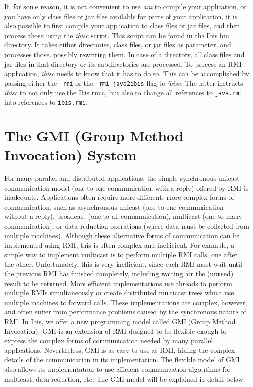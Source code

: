 \documentclass[10pt]{article}
\newcommand{\mysection}[1]{\section{#1}\label{#1}}
\begin{document}
If, for some reason, it is not convenient to use \emph{ant} to compile
your application, or you have only class files or jar files available
for parts of your application, it is also possible to first compile
your application to class files or jar files, and then process those
using the \emph{ibisc} script. This script can be found in the Ibis
bin directory. It takes either directories, class files, or jar files
as parameter, and processes those, possibly rewriting them. In case
of a directory, all class files and jar files in that directory or
its subdirectories are processed.
To process an RMI application, \emph{ibisc} needs to know that it has to
do so.  This can be accomplished by passing either the \texttt{-rmi}
or the \texttt{-rmi-java2ibis} flag to \emph{ibisc}. The latter instructs
\emph{ibisc} to not only use the Ibis rmic, but also to change all
references to \texttt{java.rmi} into references to \texttt{ibis.rmi}.

\mysection{The GMI (Group Method Invocation) System}
\label{gmi-sec}

For many parallel and distributed applications, the simple synchronous
unicast communication model (one-to-one communication with a reply)
offered by RMI is inadequate.  Applications often require more
different, more complex forms of communication, such as asynchronous
unicast (one-to-one communication without a reply), broadcast
(one-to-all communication), multicast (one-to-many communication), or
data reduction operations (where data must be collected from multiple
machines).  Although these alternative forms of communication can be
implemented using RMI, this is often complex and inefficient. For
example, a simple way to implement multicast is to perform multiple
RMI calls, one after the other. Unfortunately, this is very
inefficient, since each RMI must wait until the previous RMI has
finished completely, including waiting for the (unused) result to be
returned. More efficient implementations use threads to perform
multiple RMIs simultaneously or create distributed multicast trees
which use multiple machines to forward calls. These implementations
are complex, however, and often suffer from performance problems
caused by the synchronous nature of RMI.  In Ibis, we offer a new
programming model called GMI (Group Method Invocation). GMI is an
extension of RMI designed to be flexible enough to express the complex
forms of communication needed by many parallel
applications. Nevertheless, GMI is as easy to use as RMI, hiding the
complex details of the communication in its implementation. The
flexible model of GMI also allows its implementation to use efficient
communication algorithms for multicast, data reduction, etc. The GMI
model will be explained in detail below.
\end{document}
